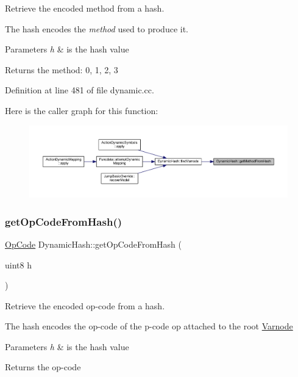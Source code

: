 Retrieve the encoded method from a hash. 

The hash encodes the {\itshape method} used to produce it. 
\begin{DoxyParams}{Parameters}
{\em h} & is the hash value \\
\hline
\end{DoxyParams}
\begin{DoxyReturn}{Returns}
the method\+: 0, 1, 2, 3 
\end{DoxyReturn}


Definition at line 481 of file dynamic.\+cc.

Here is the caller graph for this function\+:
\nopagebreak
\begin{figure}[H]
\begin{center}
\leavevmode
\includegraphics[width=350pt]{class_dynamic_hash_a0f43ee0fdfcd0ad103fc7125cc8d5ad0_icgraph}
\end{center}
\end{figure}
\mbox{\label{class_dynamic_hash_acf0da7edbf8321e9489e819ffbb5111b}} 
\subsubsection{\texorpdfstring{getOpCodeFromHash()}{getOpCodeFromHash()}}
{\footnotesize\ttfamily \mbox{\hyperlink{opcodes_8hh_abeb7dfb0e9e2b3114e240a405d046ea7}{Op\+Code}} Dynamic\+Hash\+::get\+Op\+Code\+From\+Hash (\begin{DoxyParamCaption}\item[{uint8}]{h }\end{DoxyParamCaption})\hspace{0.3cm}{\ttfamily [static]}}



Retrieve the encoded op-\/code from a hash. 

The hash encodes the op-\/code of the p-\/code op attached to the root \mbox{\hyperlink{class_varnode}{Varnode}} 
\begin{DoxyParams}{Parameters}
{\em h} & is the hash value \\
\hline
\end{DoxyParams}
\begin{DoxyReturn}{Returns}
the op-\/code 
\end{DoxyReturn}


